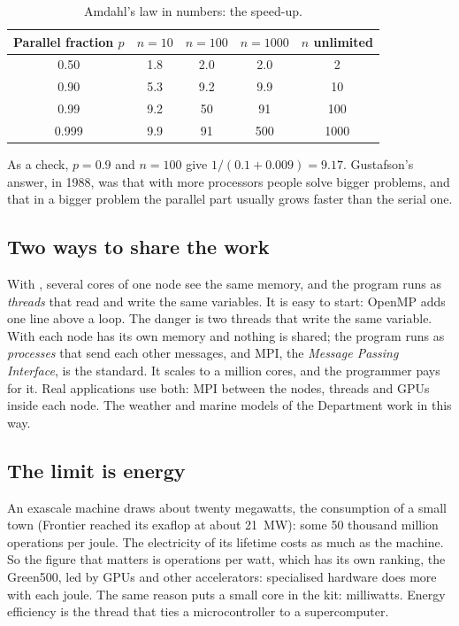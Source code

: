 \begin{table}[htb]
\centering\small
\caption{Amdahl's law in numbers: the speed-up.}\label{tab:by:amdahl}
\begin{tabular}{@{}ccccc@{}}
\toprule
\textbf{Parallel fraction $p$} & $n=10$ & $n=100$ & $n=1000$ & $n$ unlimited\\
\midrule
0.50 & 1.8 & 2.0 & 2.0 & 2\\
0.90 & 5.3 & 9.2 & 9.9 & 10\\
0.99 & 9.2 & 50 & 91 & 100\\
0.999 & 9.9 & 91 & 500 & 1000\\
\bottomrule
\end{tabular}
\end{table}

As a check, $p=0.9$ and $n=100$ give $1/(0.1+0.009)=9.17$. Gustafson's
answer, in 1988, was that with more processors people solve bigger problems,
and that in a bigger problem the parallel part usually grows faster than the
serial one.

\subsection{Two ways to share the work}

With , several cores of one node see the same memory, and
the program runs as \emph{threads} that read and write the same variables.
It is easy to start: OpenMP adds one line above a loop. The danger is two
threads that write the same variable. With  each
node has its own memory and nothing is shared; the program runs as
\emph{processes} that send each other messages, and MPI, the \emph{Message
Passing Interface}, is the standard. It scales to a million cores, and the
programmer pays for it. Real applications use both: MPI between the nodes,
threads and GPUs inside each node. The weather and marine models of the
Department work in this way.

\subsection{The limit is energy}

An exascale machine draws about twenty megawatts, the consumption of a small
town (Frontier reached its exaflop at about 21~MW): some 50 thousand million
operations per joule. The electricity of its lifetime costs as much as the
machine. So the figure that matters is operations per watt, which has its
own ranking, the Green500, led by GPUs and other accelerators: specialised
hardware does more with each joule. The same reason puts a small \riscv core
in the kit: milliwatts. Energy efficiency is the thread that ties a
microcontroller to a supercomputer.

